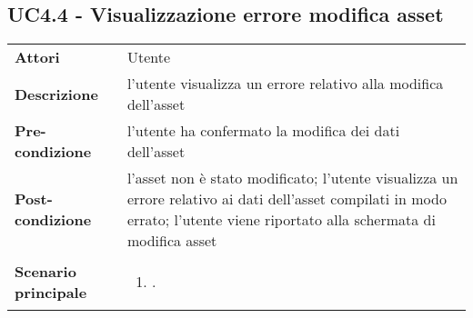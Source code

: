 \subsection{UC4.4 - Visualizzazione errore modifica asset} 
\label{sssec:UC4.4} 
\def\arraystretch{1.5}
\begin{tabularx}{\textwidth}{l|p{}}
	\rowcolor{I} \multicolumn{2}{c}{\color{white}\textbf{UC4.4 - Visualizzazione errore modifica asset}} \\
	\toprule
	\endhead
	\textbf{Attori} & Utente\\
	\textbf{Descrizione} & l'utente visualizza un errore relativo alla modifica dell'asset\\
	\textbf{Pre-condizione} & l'utente ha confermato la modifica dei dati dell'asset\\
	\textbf{Post-condizione} & l'asset non è stato modificato; l'utente visualizza un errore relativo ai dati dell'asset compilati in modo errato; l'utente viene riportato alla schermata di modifica asset\\
	\textbf{Scenario principale} & \vspace{-1.2em}\begin{enumerate}[leftmargin=*,noitemsep,nosep]
		\item \nameref{sssec:UC4.4}.
	\end{enumerate}\\
	\bottomrule
\end{tabularx}

